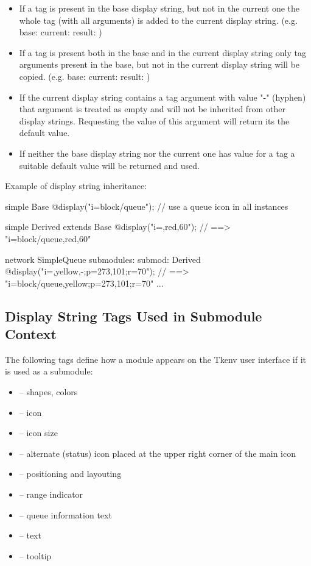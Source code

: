 \begin{itemize}
  \item If a tag is present in the base display string, but not in the current one
        the whole tag (with all arguments) is added to the current display string.
        (e.g. base:  current:  result: )
  \item If a tag is present both in the base and in the current display string
        only tag arguments present in the base, but not in the current display string
        will be copied.
        (e.g. base:  current:  result: )
  \item If the current display string contains a tag argument with value "-" (hyphen)
        that argument is treated as empty and will not be inherited from other
        display strings. Requesting the value of this argument will return its the
        default value.
  \item If neither the base display string nor the current one has value for a tag
        a suitable default value will be returned and used.
\end{itemize}

Example of display string inheritance:

\begin{ned}
simple Base {
    @display("i=block/queue"); // use a queue icon in all instances
}

simple Derived extends Base {
    @display("i=,red,60");  // ==> "i=block/queue,red,60"
}

network SimpleQueue {
    submodules:
        submod: Derived {
            @display("i=,yellow,-;p=273,101;r=70");  // ==> "i=block/queue,yellow;p=273,101;r=70"
        }
        ...
}
\end{ned}


\subsection{Display String Tags Used in Submodule Context}

The following tags define how a module appears on the Tkenv user interface
if it is used as a submodule:
\begin{itemize}
  \item{ -- shapes, colors}
  \item{ -- icon}
  \item{ -- icon size}
  \item{ -- alternate (status) icon placed at the upper right corner of the main icon}
  \item{ -- positioning and layouting}
  \item{ -- range indicator}
  \item{ -- queue information text}
  \item{ -- text}
  \item{ -- tooltip}
\end{itemize}

